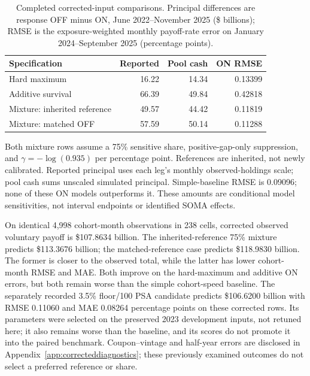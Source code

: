 \begin{table}[H]
\centering\small
\caption{Completed corrected-input comparisons. Principal differences are response OFF minus ON, June 2022--November 2025 (\$ billions); RMSE is the exposure-weighted monthly payoff-rate error on January 2024--September 2025 (percentage points).}\label{tab:correctedresults}
\begin{tabular}{@{}p{5.4 cm}rrr@{}}\toprule
Specification & Reported & Pool cash & ON RMSE\\\midrule
Hard maximum & 16.22 & 14.34 & 0.13399 \\
Additive survival & 66.39 & 49.84 & 0.42818 \\
Mixture: inherited reference & 49.57 & 44.42 & 0.11819 \\
Mixture: matched OFF & 57.59 & 50.14 & 0.11288 \\
\bottomrule\end{tabular}
\begin{minipage}{0.94\textwidth}\footnotesize
Both mixture rows assume a 75\% sensitive share, positive-gap-only suppression, and $\gamma=-\log(0.935)$ per percentage point. References are inherited, not newly calibrated. Reported principal uses each leg's monthly observed-holdings scale; pool cash sums unscaled simulated principal. Simple-baseline RMSE is 0.09096; none of these ON models outperforms it. These amounts are conditional model sensitivities, not interval endpoints or identified SOMA effects.
\end{minipage}
\end{table}


On identical 4,998 cohort-month observations in 238 cells, corrected observed voluntary payoff is \$107.8634 billion. The inherited-reference 75\% mixture predicts \$113.3676 billion; the matched-reference case predicts \$118.9830 billion. The former is closer to the observed total, while the latter has lower cohort-month RMSE and MAE. Both improve on the hard-maximum and additive ON errors, but both remain worse than the simple cohort-speed baseline. The separately recorded 3.5\% floor/100 PSA candidate predicts \$106.6200 billion with RMSE 0.11060 and MAE 0.08264 percentage points on these corrected rows. Its parameters were selected on the preserved 2023 development inputs, not retuned here; it also remains worse than the baseline, and its scores do not promote it into the paired benchmark. Coupon--vintage and half-year errors are disclosed in Appendix~\ref{app:correcteddiagnostics}; these previously examined outcomes do not select a preferred reference or share.

